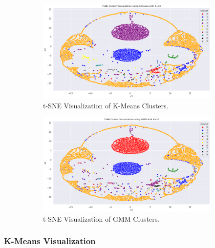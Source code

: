         \begin{figure}[H]
            \centering
            \begin{subfigure}[c]{0.47\textwidth}
                \centering
                \includegraphics[width=\textwidth]{../figures/plots/section3/tsne_kmeans_clusters.png}
                \caption{t-SNE Visualization of K-Means Clusters.}
                \label{fig:tsne_kmeans}
            \end{subfigure}
            \hfill
            \begin{subfigure}[c]{0.47\textwidth}
                \centering
                \includegraphics[width=\textwidth]{../figures/plots/section3/tsne_gmm_clusters.png}
                \caption{t-SNE Visualization of GMM Clusters.}
                \label{fig:tsne_gmm}
            \end{subfigure}
            \vspace{-0.1cm}
            \caption{}
            \label{fig:}
        \end{figure}

        \subsubsection{K-Means Visualization \\}
        
